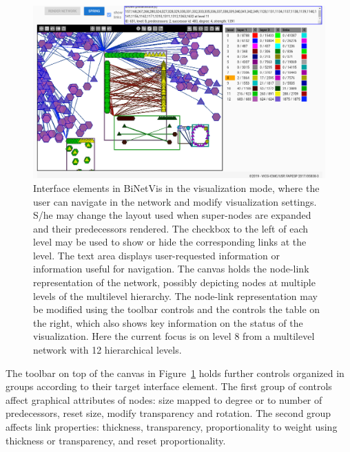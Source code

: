\documentclass[runningheads]{llncs}
\begin{document}
\begin{figure}\centering
 \includegraphics[width=\textwidth]{secondPhase_}
  \caption{Interface elements in BiNetVis in the visualization mode, where the user can navigate in the network and modify visualization settings.
  S/he may change the layout used when super-nodes are expanded and their predecessors rendered.  The checkbox to the left of each level may be used to show or hide the corresponding links at the level.
  The text area displays user-requested information or information useful for navigation.
  The canvas holds the node-link representation of the network, possibly depicting nodes at multiple levels of the multilevel hierarchy. The node-link representation may be modified using the toolbar controls and the controls the table on the right, which also shows key information on the status of the visualization. Here the current focus is on level 8 from a multilevel network with 12 hierarchical levels. 
  }\label{secondPhase}
\end{figure}

The toolbar on top of the canvas in Figure~\ref{secondPhase} holds further controls organized in groups according to their target interface element.
The first group of controls affect graphical attributes of nodes: size mapped to degree or to number of predecessors, reset size, modify transparency and rotation.
The second group affects link properties: thickness, transparency, proportionality to weight
using thickness or transparency, and reset proportionality.
\end{document}
